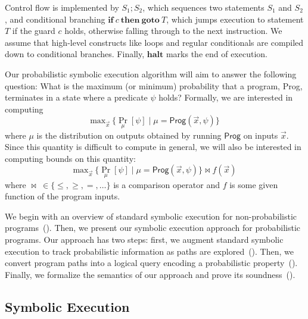 \documentclass[acmsmall,review,anonymous]{acmart}\settopmatter{printfolios=true,printccs=false,printacmref=false}
\begin{document}
Control flow is implemented by $S_1 ; S_2$, which sequences two statements $S_1$
and $S_2$, and conditional branching $\mathbf{if}~c~\mathbf{then~goto}~T$, which
jumps execution to statement $T$ if the guard $c$ holds, otherwise falling
through to the next instruction. We assume that high-level constructs like loops
and regular conditionals are compiled down to conditional branches. Finally,
$\mathbf{halt}$ marks the end of execution.

Our probabilistic symbolic execution algorithm will aim to answer the following question: What is the maximum (or minimum) probability that a program, \textsf{Prog}, terminates in a state where a predicate $\psi$ holds?
% 
Formally, we are interested in computing
\[
  \text{max}_{\vec{x}}\ \{ \Pr_\mu[\psi] \mid \mu = \mathsf{Prog}(\vec{x}, \psi)\}
\]
where $\mu$ is the distribution on outputs obtained by running $\mathsf{Prog}$ on inputs $\vec{x}$.
% 
Since this quantity is difficult to compute in general, we will also be interested in computing bounds on this quantity:
\[
  \text{max}_{\vec{x}}\ \{ \Pr_\mu[\psi] \mid \mu = \mathsf{Prog}(\vec{x}, \psi)\}
  \bowtie f(\vec{x})
\]
where $\bowtie~\in\{ \leq, \geq, =, \ldots \}$ is a comparison operator and $f$ is some given function of the program inputs.

We begin with an overview of standard symbolic execution for non-probabilistic
programs~(). Then, we present our symbolic execution approach
for probabilistic programs. Our approach has two steps: first, we augment
standard symbolic execution to track probabilistic information as paths are
explored~(). Then, we convert program paths into a logical
query encoding a probabilistic property~().
% 
Finally, we formalize the semantics of our approach and prove its soundness~().

\subsection{Symbolic Execution}
\label{sec:symex}
\end{document}
